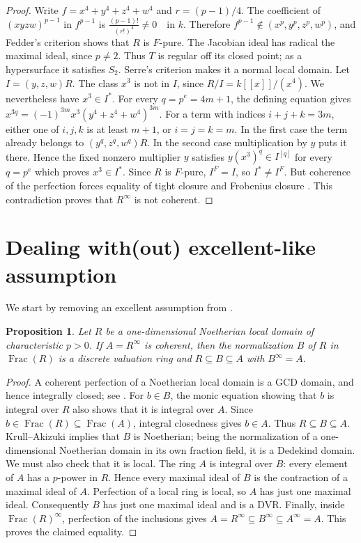 \documentclass[11pt,a4paper]{amsart}
\numberwithin{equation}{section}
\newtheorem{proposition}[theorem]{Proposition}
\newcommand{\Frac}{\operatorname{Frac}}
\begin{document}
 \begin{proof}	Write $f=x^4+y^4+z^4+w^4$ and $r=(p-1)/4$.	The coefficient of $(xyzw)^{p-1}$ in $f^{p-1}$ is
$\frac{(p-1)!}{(r!)^4}\neq0\quad\text{in }k.$	Therefore $f^{p-1}\notin(x^p,y^p,z^p,w^p)$, and Fedder's 	criterion \cite{Fedder} shows that $R$ is $F$-pure. 	The Jacobian ideal has radical the maximal ideal, since $p\neq2$. 	Thus $T$ is regular off its closed point; as a hypersurface it	satisfies $S_2$. Serre's criterion makes it a normal local domain.
Let $I=(y,z,w)R$. The class $x^3$ is not in $I$, since 	$R/I=k[[x]]/(x^4)$. 	We nevertheless have $x^3\in I^*$. For every $q=p^e=4m+1$, the defining equation gives
$x^{3q}=(-1)^{3m}x^3(y^4+z^4+w^4)^{3m}. $ 	For a term with indices $i+j+k=3m$, either one of 	$i,j,k$ is at least $m+1$, or $i=j=k=m$. 	In the first case the term already belongs to 	$(y^q,z^q,w^q)R$. 	In the second case multiplication by $y$ puts it there. 	Hence the fixed nonzero multiplier $y$ satisfies	$y(x^3)^q\in I^{[q]}$ for every  $q=p^e $ 	which proves $x^3\in I^*$. 	Since $R$ is $F$-pure, $I^F=I$, so $I^*\neq I^F$. 	But coherence of the perfection forces equality of tight closure 	and Frobenius closure \cite[Section~3]{Shim}. 	This contradiction proves that $R^\infty$ is not coherent.
 \end{proof}
 
\section{Dealing with(out) excellent-like assumption}
 
 We start by removing an excellent assumption from \cite{Shim}.
 \begin{proposition}\label{prop:one}	Let $R$ be a one-dimensional Noetherian local domain of characteristic	$p>0$. If $A=R^\infty$ is coherent, then the normalization $B$ of $R$ in	$\Frac(R)$ is a discrete valuation ring and
$R\subseteq B\subseteq A$ with $ B^\infty=A.$
 \end{proposition}
 
 \begin{proof}	A coherent perfection of a Noetherian local domain is a GCD domain,	and hence integrally closed; see \cite[Corollary~3.7]{moh}. 	For $b\in B$, the monic equation showing that $b$ is integral over $R$ 	also shows that it is integral over $A$. Since 	$b\in\Frac(R)\subseteq\Frac(A)$, integral closedness gives $b\in A$.	Thus $R\subseteq B\subseteq A$.	Krull--Akizuki implies that $B$ is Noetherian; being the normalization	of a one-dimensional Noetherian domain in its own fraction field,	it is a Dedekind domain.	We must also check that it is local. The ring $A$ is integral over $B$:	every element of $A$ has a $p$-power in $R$. Hence every maximal ideal	of $B$ is the contraction of a maximal ideal of $A$. Perfection of a	local ring is local, so $A$ has just one maximal ideal. Consequently	$B$ has just one maximal ideal and is a DVR.
 Finally, inside $\Frac(R)^\infty$, perfection of the inclusions gives	$A=R^\infty\subseteq B^\infty\subseteq A^\infty=A.$	This proves the claimed equality.
 \end{proof}
 
\end{document}
